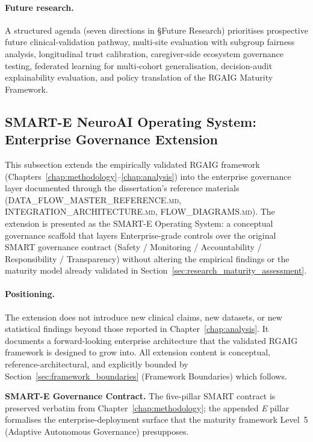 \paragraph{Future research.} A structured agenda (seven directions in §Future Research) prioritises prospective future clinical-validation pathway, multi-site evaluation with subgroup fairness analysis, longitudinal trust calibration, caregiver-side ecosystem governance testing, federated learning for multi-cohort generalisation, decision-audit explainability evaluation, and policy translation of the RGAIG Maturity Framework.

\subsection{SMART-E NeuroAI Operating System: Enterprise Governance Extension}
\label{sec:smart_e_extension}

This subsection extends the empirically validated RGAIG framework (Chapters~\ref{chap:methodology}--\ref{chap:analysis}) into the enterprise governance layer documented through the dissertation's reference materials (\textsc{DATA\_FLOW\_MASTER\_REFERENCE.md}, \textsc{INTEGRATION\_ARCHITECTURE.md}, \textsc{FLOW\_DIAGRAMS.md}). The extension is presented as the SMART-E Operating System: a conceptual governance scaffold that layers Enterprise-grade controls over the original SMART governance contract (Safety / Monitoring / Accountability / Responsibility / Transparency) without altering the empirical findings or the maturity model already validated in Section~\ref{sec:research_maturity_assessment}.

\paragraph{Positioning.} The extension does not introduce new clinical claims, new datasets, or new statistical findings beyond those reported in Chapter~\ref{chap:analysis}. It documents a forward-looking enterprise architecture that the validated RGAIG framework is designed to grow into. All extension content is conceptual, reference-architectural, and explicitly bounded by Section~\ref{sec:framework_boundaries} (Framework Boundaries) which follows.

\noindent\textbf{SMART-E Governance Contract.} The five-pillar SMART contract is preserved verbatim from Chapter~\ref{chap:methodology}; the appended \emph{E} pillar formalises the enterprise-deployment surface that the maturity framework Level~5 (Adaptive Autonomous Governance) presupposes.

